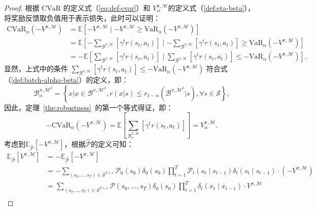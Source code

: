 \begin{proof}
根据 $\mathrm{CVaR}$ 的定义式（\ref{eq:def-cvar}）和 $V_\alpha^{\pi,\mathcal{M}}$的定义式（\ref{def:eta-beta}），将奖励反馈取负值用于表示损失，此时可以证明：
\begin{equation}
\begin{aligned}
\mathrm{CVaR}_\alpha(-V^{\pi,\mathcal{M}}) &= \mathbb{E}\left[-V^{\pi,\mathcal{M}}\mid -V^{\pi,\mathcal{M}} \geq \mathrm{VaR}_\alpha(-V^{\pi,\mathcal{M}})\right]\\
&=\mathbb{E}\left[-{\sum}_{\mathcal{B}^{\pi,\mathcal{M}}}\left[\gamma^t r(s_t,a_t)\right]\mid -{\sum}_{\mathcal{B}^{\pi,\mathcal{M}}}\left[\gamma^t r(s_t,a_t)\right] \geq \mathrm{VaR}_\alpha(-V^{\pi,\mathcal{M}})\right]\\
&=-\mathbb{E}\left[{\sum}_{\mathcal{B}^{\pi,\mathcal{M}}}\left[\gamma^t r(s_t,a_t)\right]\mid {\sum}_{\mathcal{B}^{\pi,\mathcal{M}}}\left[\gamma^t r(s_t,a_t)\right] \leq -\mathrm{VaR}_\alpha(-V^{\pi,\mathcal{M}})\right].
\end{aligned}
\end{equation}
显然，上式中的条件 ${\sum}_{\mathcal{B}^{\pi,\mathcal{M}}}\left[\gamma^t r(s_t,a_t)\right] \leq -\mathrm{VaR}_\alpha(-V^{\pi,\mathcal{M}})$ 符合式（\ref{def:batch-alpha-beta}）的定义，即：
\begin{equation}\label{def:batch-alpha-beta}
    \mathcal{B}_\alpha^{\pi,\mathcal{M}^\beta}=\left\{x|x\in\mathcal{B}^{\pi,\mathcal{M}^\beta},r(x|s)\leq r_{1-\alpha}(\mathcal{B}^{\pi,\mathcal{M}^\beta}|s), \forall s \in \mathcal{S}\right\},
\end{equation}
因此，定理~\ref{the:robustness}~的第一个等式得证，即：
\begin{equation}
-\mathrm{CVaR}_\alpha(-V^{\pi,\mathcal{M}}) = \mathbb{E}\left[{\sum}_{\mathcal{B}_\alpha^{\pi,\mathcal{M}}}\left[\gamma^t r(s_t,a_t)\right]\right] = V_\alpha^{\pi,\mathcal{M}}.
\end{equation}
考虑到$\mathbb{E}_{\hat{\mathcal{P}}}[-V^{\pi,\mathcal{M}}]$，根据$\hat{\mathcal{P}}$的定义可知：
\begin{equation}
\begin{aligned}
    \mathbb{E}_{\hat{\mathcal{P}}}[V^{\pi,\mathcal{M}}] &= -\mathbb{E}_{\hat{\mathcal{P}}}[-V^{\pi,\mathcal{M}}]\\
    &= -\sum_{(s_0,\ldots,s_T)\in\mathcal{S}^{T+1}}\mathcal{P}_0(s_0)\delta_0(s_0)\prod_{t=1}^{T}\mathcal{P}_t(s_t\mid s_{t-1})\delta_t(s_t\mid s_{t-1})\cdot (-V^{\pi,\mathcal{M}})\\
    &= \sum_{(s_0,\ldots,s_T)\in\mathcal{S}^{T+1}}\mathcal{P}(s_0,\ldots,s_T)\delta_0(s_0)\prod_{t=1}^{T}\delta_t(x_t\mid x_{t-1})\cdot V^{\pi,\mathcal{M}}\\

\end{aligned}
\end{equation}
\end{proof}
